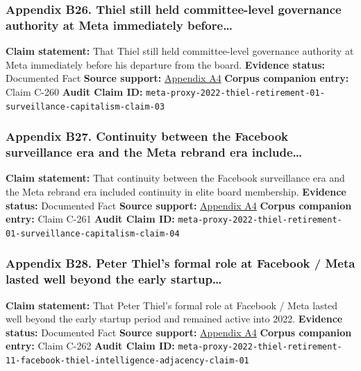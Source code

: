 \documentclass[
  american,
  11pt,
  letterpaper,
]{article}
\begin{document}
\subsubsection{Appendix B26. Thiel still held committee-level governance
authority at Meta immediately
before\ldots{}}\label{appendix-b26-thiel-still-held-committee-level-governance-authority-at-meta-immediately-before}

\textbf{Claim statement:} That Thiel still held committee-level
governance authority at Meta immediately before his departure from the
board. \textbf{Evidence status:} Documented Fact \textbf{Source
support:}
\hyperref[appendix-a4-meta-platforms-inc-2022-definitive-proxy-statement]{Appendix
A4} \textbf{Corpus companion entry:} Claim C-260 \textbf{Audit Claim
ID:}
\texttt{meta-proxy-2022-thiel-retirement-01-surveillance-capitalism-claim-03}

\subsubsection{Appendix B27. Continuity between the Facebook
surveillance era and the Meta rebrand era
include\ldots{}}\label{appendix-b27-continuity-between-the-facebook-surveillance-era-and-the-meta-rebrand-era-include}

\textbf{Claim statement:} That continuity between the Facebook
surveillance era and the Meta rebrand era included continuity in elite
board membership. \textbf{Evidence status:} Documented Fact
\textbf{Source support:}
\hyperref[appendix-a4-meta-platforms-inc-2022-definitive-proxy-statement]{Appendix
A4} \textbf{Corpus companion entry:} Claim C-261 \textbf{Audit Claim
ID:}
\texttt{meta-proxy-2022-thiel-retirement-01-surveillance-capitalism-claim-04}

\subsubsection{Appendix B28. Peter Thiel's formal role at Facebook /
Meta lasted well beyond the early
startup\ldots{}}\label{appendix-b28-peter-thiel-s-formal-role-at-facebook-meta-lasted-well-beyond-the-early-startup}

\textbf{Claim statement:} That Peter Thiel's formal role at Facebook /
Meta lasted well beyond the early startup period and remained active
into 2022. \textbf{Evidence status:} Documented Fact \textbf{Source
support:}
\hyperref[appendix-a4-meta-platforms-inc-2022-definitive-proxy-statement]{Appendix
A4} \textbf{Corpus companion entry:} Claim C-262 \textbf{Audit Claim
ID:}
\texttt{meta-proxy-2022-thiel-retirement-11-facebook-thiel-intelligence-adjacency-claim-01}
\end{document}
